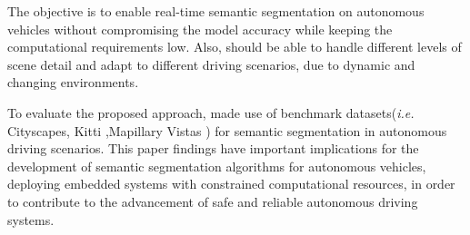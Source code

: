   The objective is to enable real-time semantic segmentation on autonomous vehicles without
  compromising the model accuracy while keeping the computational requirements low. Also,
  should be able to handle different levels of scene detail and adapt to different driving
  scenarios, due to dynamic and changing environments.


  To evaluate the proposed approach, made use of benchmark datasets(\emph{i.e.}
  Cityscapes\cite{cordts2016cityscapes}, Kitti\cite{Geiger2012CVPR} ,Mapillary Vistas \cite{neuhold2017mapillary}) for semantic
  segmentation in autonomous driving scenarios. This paper findings have important implications for
  the development of  semantic segmentation algorithms for autonomous vehicles,
  deploying embedded systems with constrained computational resources, in order
  to contribute to the advancement of safe and reliable autonomous driving systems.
